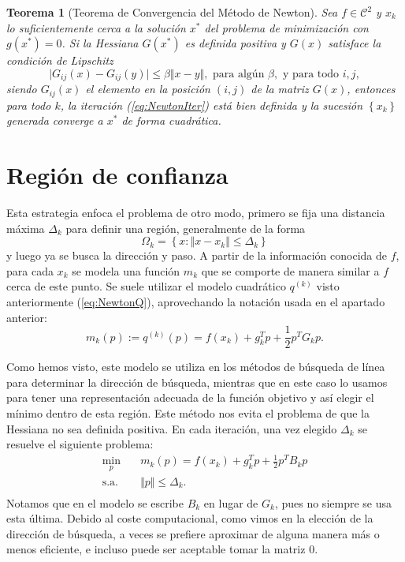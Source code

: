 \documentclass[11pt,a4paper]{book}
\newtheorem{theorem}{Teorema}[chapter]
\theoremstyle{definition}
\theoremstyle{remark}
\begin{document}
\begin{theorem}[Teorema de Convergencia del Método de Newton]
	Sea
	$f \in \mathcal{C}^2$ y $x_k$ lo suficientemente cerca a
	la solución $x^*$ del problema de minimización con
	$g(x^*)=0$. Si la Hessiana $G(x^*)$ es definida positiva y
	$G(x)$ satisface la condición de Lipschitz
	\begin{equation}
		\vert G_{ij}(x) - G_{ij}(y) \vert \leq 
		\beta \Vert x-y \Vert,
		\text{ para algún } \beta,
		\text{ y para todo } i,j,
	\end{equation}
	siendo $G_{ij}(x)$ el elemento en la posición $(i,j)$ de la matriz
	$G(x)$, entonces para todo $k$, la iteración (\ref{eq:NewtonIter})
	está bien definida y la sucesión $\left\{ x_k \right\}$
	generada converge a $x^*$ de forma cuadrática.
\end{theorem}

\section{Región de confianza}

Esta estrategia enfoca el problema de otro modo, primero se fija una distancia máxima $\Delta_k$ para definir una región, generalmente de la forma
\begin{equation}
	\Omega_k = \left\{x : \Vert x-x_k \Vert \leq \Delta_k \right\}
\end{equation}
y luego ya se busca la dirección y paso.
A partir de la información conocida de $f$, para cada $x_k$ se modela una función $m_k$ que se comporte de manera similar a $f$ cerca de este punto.
Se suele utilizar el modelo cuadrático $q^{(k)}$ visto anteriormente (\ref{eq:NewtonQ}), aprovechando la notación usada en el apartado anterior:
\begin{equation}
	m_k(p) := q^{(k)}(p) = f(x_k) + g^T_kp + \frac{1}{2}p^TG_kp.
\end{equation}

Como hemos visto, este modelo se utiliza en los métodos de búsqueda de línea para determinar la dirección de búsqueda, mientras que en este caso lo usamos para tener una representación adecuada de la función objetivo y así elegir el mínimo dentro de esta región.
Este método nos evita el problema de que la Hessiana no sea definida positiva.
En cada iteración, una vez elegido $\Delta_k$ se resuelve el siguiente problema:
\begin{equation}
\label{min:tr}
\begin{aligned}
	\min_{p} \quad & m_k(p) = f(x_k) + g^T_kp + \frac{1}{2}p^TB_kp \\
	\text{s.a.} \quad & \Vert p \Vert \leq \Delta_k. \\
\end{aligned}
\end{equation}
Notamos que en el modelo se escribe $B_k$ en lugar de $G_k$, pues no siempre se usa esta última.
Debido al coste computacional, como vimos en la elección de la dirección de búsqueda, a veces se prefiere aproximar de alguna manera más o menos eficiente, e incluso puede ser aceptable tomar la matriz $0$.
\end{document}

